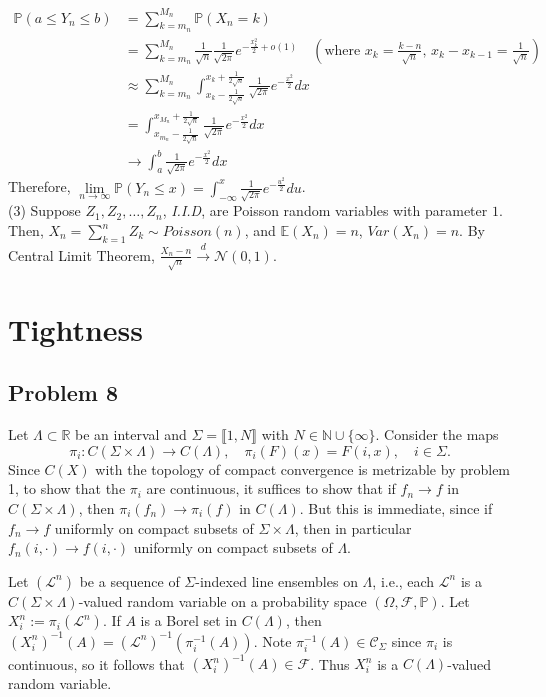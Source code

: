 \documentclass[12pt]{article}
\begin{document}
\begin{align*}
	\mathbb{P}(a\leqslant Y_{n}\leqslant b)&=\sum_{k=m_{n}}^{M_{n}}\mathbb{P}(X_{n}=k)\\
	&=\sum_{k=m_{n}}^{M_{n}}\frac{1}{\sqrt{n}}\frac{1}{\sqrt{2\pi}}e^{-\frac{x_{k}^2}{2}+o(1)}\quad(\text{where $x_{k}=\frac{k-n}{\sqrt{n}}$, $x_{k}-x_{k-1}=\frac{1}{\sqrt{n}}$})\\
	&\approx \sum_{k=m_{n}}^{M_{n}}\int_{x_{k}-\frac{1}{2\sqrt{n}}}^{x_{k}+\frac{1}{2\sqrt{n}}} \frac{1}{\sqrt{2\pi}}e^{-\frac{x^2}{2}}dx\\
	&=\int_{x_{m_{n}}-\frac{1}{2\sqrt{n}}}^{x_{M_{n}}+\frac{1}{2\sqrt{n}}} \frac{1}{\sqrt{2\pi}}e^{-\frac{x^2}{2}}dx\\
	& \rightarrow \int_{a}^{b}\frac{1}{\sqrt{2\pi}}e^{-\frac{x^2}{2}}dx
\end{align*}
Therefore, $\lim\limits_{n\rightarrow\infty}\mathbb{P}(Y_{n}\leqslant x)=\int_{-\infty}^{x}\frac{1}{\sqrt{2\pi}}e^{-\frac{u^2}{2}}du$.\\
(3) Suppose $Z_{1},Z_{2},\dots, Z_{n}$, \emph{I.I.D}, are Poisson random variables with parameter $1$. Then, $X_{n}=\sum\limits_{k=1}^{n}Z_{k}\sim Poisson(n)$, and $\mathbb{E}(X_{n})=n$, $Var(X_{n})=n$. By Central Limit Theorem, $\frac{X_{n}-n}{\sqrt{n}}\xrightarrow{d}\mathcal{N}(0,1)$.

\section{Tightness}

	\subsection*{Problem 8}
	
		Let $\Lambda\subset\mathbb{R}$ be an interval and $\Sigma = \llbracket 1, N\rrbracket$ with $N\in\mathbb{N}\cup\{\infty\}$. Consider the maps 
		\[
		\pi_i : C(\Sigma\times\Lambda) \to C(\Lambda), \quad \pi_i(F)(x) = F(i,x), \quad i\in\Sigma.
		\]
		Since $C(X)$ with the topology of compact convergence is metrizable by problem 1, to show that the $\pi_i$ are continuous, it suffices to show that if $f_n\to f$ in $C(\Sigma\times\Lambda)$, then $\pi_i(f_n)\to \pi_i(f)$ in $C(\Lambda)$. But this is immediate, since if $f_n\to f$ uniformly on compact subsets of $\Sigma\times\Lambda$, then in particular $f_n(i,\cdot)\to f(i,\cdot)$ uniformly on compact subsets of $\Lambda$.
		
		Let $(\mathcal{L}^n)$ be a sequence of $\Sigma$-indexed line ensembles on $\Lambda$, i.e., each $\mathcal{L}^n$ is a $C(\Sigma\times\Lambda)$-valued random variable on a probability space $(\Omega,\mathcal{F},\mathbb{P})$. Let $X_i^n := \pi_i(\mathcal{L}^n)$. If $A$ is a Borel set in $C(\Lambda)$, then $(X_i^n)^{-1}(A) = (\mathcal{L}^n)^{-1}(\pi_i^{-1}(A))$. Note $\pi_i^{-1}(A)\in\mathcal{C}_\Sigma$ since $\pi_i$ is continuous, so it follows that $(X_i^n)^{-1}(A)\in\mathcal{F}$. Thus $X_i^n$ is a $C(\Lambda)$-valued random variable.
		
\end{document}
